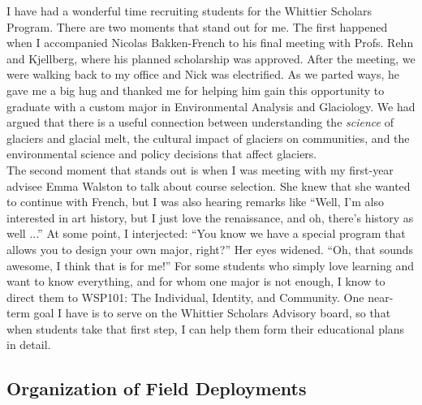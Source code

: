 \documentclass[../../../main.tex]{subfiles}
\begin{document}
I have had a wonderful time recruiting students for the Whittier Scholars Program.  There are two moments that stand out for me.  The first happened when I accompanied Nicolas Bakken-French to his final meeting with Profs. Rehn and Kjellberg, where his planned scholarship was approved.  After the meeting, we were walking back to my office and Nick was electrified.  As we parted ways, he gave me a big hug and thanked me for helping him gain this opportunity to graduate with a custom major in Environmental Analysis and Glaciology.  We had argued that there is a useful connection between understanding the \textit{science} of glaciers and glacial melt, the cultural impact of glaciers on communities, and the environmental science and policy decisions that affect glaciers.
\\
\vspace{0.15cm}
The second moment that stands out is when I was meeting with my first-year advisee Emma Walston to talk about course selection.  She knew that she wanted to continue with French, but I was also hearing remarks like ``Well, I'm also interested in art history, but I just love the renaissance, and oh, there's history as well ...''  At some point, I interjected: ``You know we have a special program that allows you to design your own major, right?''  Her eyes widened.  ``Oh, that sounds awesome, I think that is for me!''  For some students who simply love learning and want to know everything, and for whom one major is not enough, I know to direct them to WSP101: The Individual, Identity, and Community.  One near-term goal I have is to serve on the Whittier Scholars Advisory board, so that when students take that first step, I can help them form their educational plans in detail.

\subsection{Organization of Field Deployments}
\end{document}
